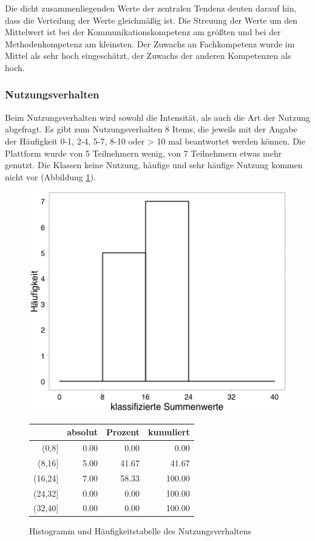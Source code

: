 \documentclass[12pt,smallheadings, bibliography=totoc]{scrartcl}
\begin{document}
Die dicht zusammenliegenden Werte der zentralen Tendenz deuten darauf
hin, dass die Verteilung der Werte gleichmäßig ist. Die Streuung der
Werte um den Mittelwert ist bei der Kommunikationskompetenz am größten
und bei der Methodenkompetenz am kleinsten. Der Zuwachs an Fachkompetenz
wurde im Mittel als sehr hoch eingeschätzt, der Zuwachs der anderen
Kompetenzen als hoch.

\subsubsection{Nutzungsverhalten}\label{nutzungsverhalten}

Beim Nutzungsverhalten wird sowohl die Intensität, als auch die Art der
Nutzung abgefragt. Es gibt zum Nutzungsverhalten 8 Items, die jeweils
mit der Angabe der Häufigkeit 0-1, 2-4, 5-7, 8-10 oder \textgreater{} 10
mal beantwortet werden können. Die Plattform wurde von 5 Teilnehmern
wenig, von 7 Teilnehmern etwas mehr genutzt. Die Klassen keine Nutzung,
häufige und sehr häufige Nutzung kommen nicht vor (Abbildung
\ref{fig:NV}).

\begin{figure}[H]
\begin{minipage}{.4\linewidth}
\includegraphics[width=0.8\linewidth]{Anhang/NVHistnn.png}

\label{pic:aufbau}
\end{minipage}
\begin{minipage}{.4\linewidth}
\centering
\raisebox{\depth}
{\begin{tabular}{rrrr}
  \hline
 & absolut & Prozent & kumuliert \\ 
  \hline
(0,8] & 0.00 & 0.00 & 0.00 \\ 
  (8,16] & 5.00 & 41.67 & 41.67 \\ 
  (16,24] & 7.00 & 58.33 & 100.00 \\ 
  (24,32] & 0.00 & 0.00 & 100.00 \\ 
  (32,40] & 0.00 & 0.00 & 100.00 \\ 
   \hline
\end{tabular}

}
\label{tab:defis}
\end{minipage}
\caption{Histogramm und Häufigkeitstabelle des Nutzungsverhaltens}
\label{fig:NV}
\end{figure}
\end{document}
